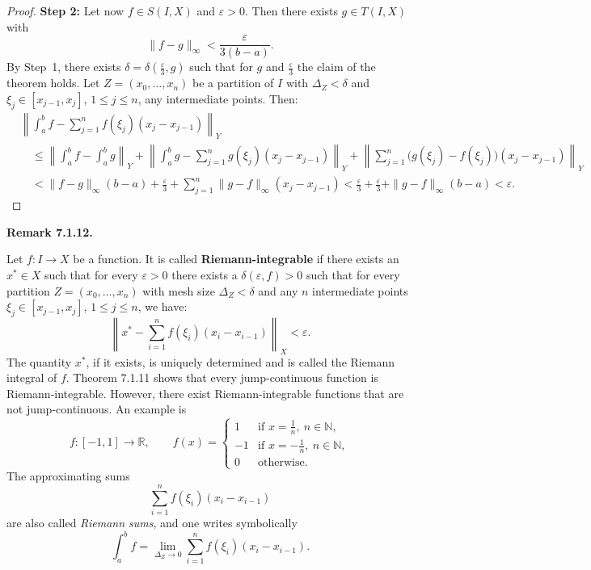 \documentclass[12pt]{article}
\newenvironment{bemerkung}[1]{%
  \par\vspace{6pt}\noindent\textbf{Remark #1.}\itshape\space
}{%
  \par\vspace{6pt}
}
\begin{document}
\begin{proof}
\medskip
\textbf{Step 2:}
Let now $f\in S(I,X)$ and $\varepsilon>0$. Then there exists $g\in T(I,X)$ with
\[
\|f-g\|_\infty<\frac{\varepsilon}{3(b-a)}.
\]
By Step~1, there exists $\delta=\delta\!\left(\tfrac\varepsilon3,g\right)$ such that for $g$ and $\tfrac\varepsilon3$ the claim of the theorem holds.
Let $Z=(x_0,\ldots,x_n)$ be a partition of $I$ with $\Delta_Z<\delta$ and $\xi_j\in[x_{j-1},x_j]$,
$1\le j\le n$, any intermediate points. Then:
\begin{align*}
&\left\|\int_a^b f-\sum_{j=1}^{n}f(\xi_j)(x_j-x_{j-1})\right\|_Y\\
&\quad\le
\left\|\int_a^b f-\int_a^b g\right\|_Y
+\left\|\int_a^b g-\sum_{j=1}^{n}g(\xi_j)(x_j-x_{j-1})\right\|_Y
+\left\|\sum_{j=1}^{n}\bigl(g(\xi_j)-f(\xi_j)\bigr)(x_j-x_{j-1})\right\|_Y\\
&\quad<\|f-g\|_\infty(b-a)+\frac{\varepsilon}{3}+\sum_{j=1}^{n}\|g-f\|_\infty(x_j-x_{j-1})
<\frac{\varepsilon}{3}+\frac{\varepsilon}{3}+\|g-f\|_\infty(b-a)<\varepsilon.
\end{align*}
\end{proof}

\begin{bemerkung}{7.1.12}
Let $f:I\to X$ be a function. It is called \textbf{Riemann-integrable} if there exists
an $x^*\in X$ such that for every $\varepsilon>0$ there exists a $\delta(\varepsilon,f)>0$ such that for every partition
$Z=(x_0,\ldots,x_n)$ with mesh size $\Delta_Z<\delta$ and any $n$ intermediate points
$\xi_j\in[x_{j-1},x_j]$, $1\le j\le n$, we have:
\[
\left\|x^*-\sum_{i=1}^{n}f(\xi_i)(x_i-x_{i-1})\right\|_X<\varepsilon.
\]
The quantity $x^*$, if it exists, is uniquely determined and is called the Riemann integral of $f$.
Theorem 7.1.11 shows that every jump-continuous function is Riemann-integrable. However, there
exist Riemann-integrable functions that are not jump-continuous. An example is
\[
f:[-1,1]\to\mathbb R,\qquad
f(x)=
\begin{cases}
1 & \text{if } x=\tfrac{1}{n},\ n\in\mathbb N,\\
-1 & \text{if } x=-\tfrac{1}{n},\ n\in\mathbb N,\\
0 & \text{otherwise.}
\end{cases}
\]
The approximating sums
\[
\sum_{i=1}^{n}f(\xi_i)(x_i-x_{i-1})
\]
are also called \emph{Riemann sums}, and one writes symbolically
\[
\int_a^b f=\lim_{\Delta_Z\to 0}\sum_{i=1}^{n}f(\xi_i)(x_i-x_{i-1}).
\]
\end{bemerkung}
\end{document}
